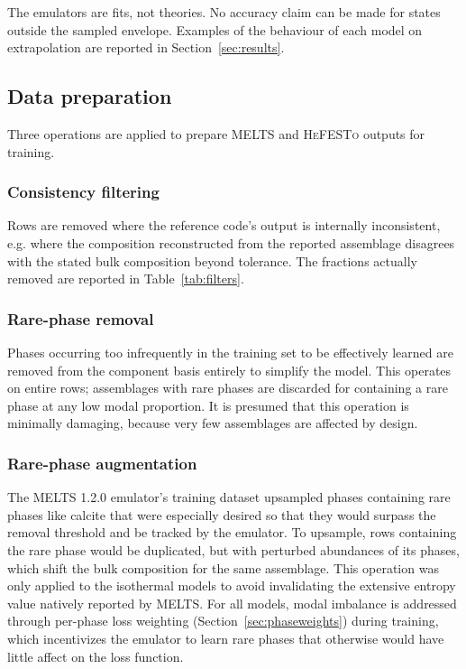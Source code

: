 The emulators are fits, not theories. No accuracy claim can be made for states outside
the sampled envelope. Examples of the behaviour of each model on extrapolation are reported
in Section~\ref{sec:results}. 

\subsection{Data preparation}
\label{sec:prep}

Three operations are applied to prepare \textsc{MELTS} and \textsc{HeFESTo} outputs for training.

\subsubsection{Consistency filtering} Rows are removed where the reference code's output
is internally inconsistent, e.g. where the composition reconstructed from the
reported assemblage disagrees with the stated bulk composition beyond tolerance. The fractions
actually removed are reported in Table~\ref{tab:filters}.

\subsubsection{Rare-phase removal} Phases occurring too infrequently in the training set
to be effectively learned are removed from the component basis entirely to simplify the model.
This operates on entire rows; assemblages with rare phases are discarded
for containing a rare phase at any low modal proportion. It is presumed that this operation is minimally damaging, because very few assemblages are affected by design. 

\subsubsection{Rare-phase augmentation} The \textsc{MELTS} 1.2.0 emulator's training dataset upsampled phases containing rare phases like calcite that were especially desired so that they would surpass the removal threshold and be tracked by the emulator. To upsample, rows containing the rare phase would be duplicated, but with perturbed abundances of its phases, which shift the bulk composition for the same assemblage. This operation was only applied to the isothermal models to avoid invalidating the extensive entropy value natively reported by \textsc{MELTS}. For all models, modal imbalance is addressed through per-phase loss weighting (Section~\ref{sec:phaseweights}) during training, which incentivizes the emulator to learn rare phases that otherwise would have little affect on the loss function.

